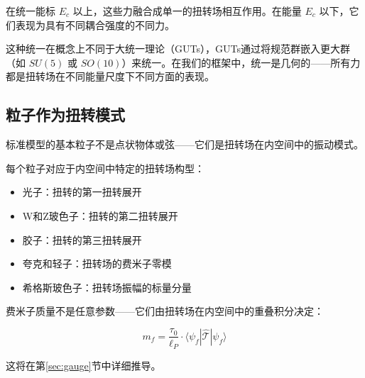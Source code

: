 在统一能标 $E_c$ 以上，这些力融合成单一的扭转场相互作用。在能量 $E_c$ 以下，它们表现为具有不同耦合强度的不同力。

这种统一在概念上不同于大统一理论（GUTs），GUTs通过将规范群嵌入更大群（如 $SU(5)$ 或 $SO(10)$）来统一。在我们的框架中，统一是几何的——所有力都是扭转场在不同能量尺度下不同方面的表现。

\subsection{粒子作为扭转模式}

标准模型的基本粒子不是点状物体或弦——它们是扭转场在内空间中的振动模式。

每个粒子对应于内空间中特定的扭转场构型：
\begin{itemize}
    \item 光子：扭转的第一扭转展开
    \item W和Z玻色子：扭转的第二扭转展开
    \item 胶子：扭转的第三扭转展开
    \item 夸克和轻子：扭转场的费米子零模
    \item 希格斯玻色子：扭转场振幅的标量分量
\end{itemize}

费米子质量不是任意参数——它们由扭转场在内空间中的重叠积分决定：

\begin{equation}
m_f = \frac{\tau_0}{\ell_P} \cdot \langle \psi_f | \hat{\mathcal{T}} | \psi_f \rangle
\end{equation}

这将在第\ref{sec:gauge}节中详细推导。

